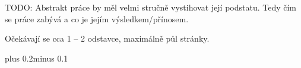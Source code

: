 \documentclass[11pt,twoside,a4paper]{book}
\begin{document}

\baselineskip

\noindent
TODO: Abstrakt práce by měl velmi stručně vystihovat její podstatu. Tedy čím se práce zabývá a co je jejím výsledkem/přínosem.

\noindent
Očekávají se cca 1 -- 2 odstavce, maximálně půl stránky.

%
%
\tableofcontents

%
%
\listoffigures

%
%
\listoftables

%
%

\mainbodystarts
\normalfont
{}\baselineskip plus 0.2\baselineskip minus 0.1\baselineskip

%
%









%



%
{
  \def\CS{$\cal C\kern-0.1667em\lower.5ex\hbox{$\cal S$}\kern-0.075em $}
  
}

%

\appendix






\end{document}
